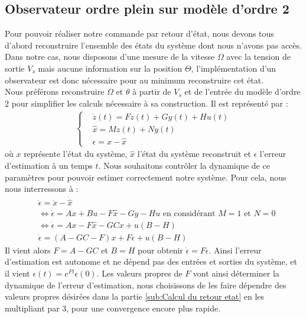 \subsection{Observateur ordre plein sur modèle d'ordre 2}
Pour pouvoir réaliser notre commande par retour d'état, nous devons tous d'abord reconstruire l'ensemble des états du système dont nous n'avons pas accès. Dans notre cas, nous disposons d'une mesure de la vitesse $\Omega$ avec la tension de sortie $V_s$ mais aucune information sur la position $\Theta$, l'implémentation d'un observateur est donc nécessaire pour au minimum reconstruire cet état.\\
Nous préférons reconstruire $\Omega$ et $\theta$ à partir de $V_s$ et de l'entrée du modèle d'ordre 2 pour simplifier les calculs nécessaire à sa construction. Il est représenté par :
\begin{align*}
\left\lbrace
\begin{aligned}
&\dot z (t) = Fz(t) + Gy(t) + Hu(t)\\
&\hat x = Mz(t) + Ny(t)\\
&\epsilon = x-\hat{x}
\end{aligned}
\right.
\end{align*} où $x$ représente l'état du système, $\hat{x}$ l'état du système reconstruit et $\epsilon$ l'erreur d'estimation à un temps $t$. Nous souhaitons contrôler la dynamique de ce paramètres pour pouvoir estimer correctement notre système. Pour cela, nous nous interressons à : \begin{align*}
&\dot{\epsilon} = \dot{x} - \dot{\hat{x}}\\
&\Leftrightarrow \dot{\epsilon} = Ax +Bu - F\hat{x} - Gy - Hu 
\text{   en considérant }M=1 \text{ et } N = 0\\
& \Leftrightarrow \dot{\epsilon} = Ax - F\hat{x} - GCx + u(B-H)\\
& \dot{\epsilon} = (A-GC-F)x + F\epsilon + u(B-H)
\end{align*} 
Il vient alors $F = A-GC$ et $B=H$ pour obtenir $\dot{\epsilon} = F\epsilon$. Ainsi l'erreur d'estimation est autonome et ne dépend pas des entrées et sorties du système, et il vient $\epsilon(t) = e^{Ft}\epsilon(0)$. Les valeurs propres de $F$ vont ainsi déterminer la dynamique de l'erreur d'estimation, nous choisissons de les faire dépendre des valeurs propres désirées dans la partie \ref{sub:Calcul du retour etat} en les multipliant par 3, pour une convergence encore plus rapide. 

